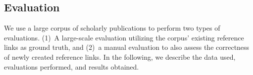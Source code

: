 



\subsection{Evaluation}\label{sec:eval}

We use a large corpus of scholarly publications to perform two types of evaluations. (1)~A large-scale evaluation utilizing the corpus' existing reference links as ground truth, and (2)~a manual evaluation to also assess the correctness of newly created reference links. In the following, we describe the data used, evaluations performed, and results obtained.

